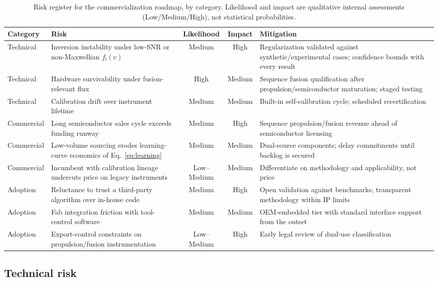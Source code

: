\begin{table}[htbp]
\centering
\caption{Risk register for the commercialization roadmap, by category. Likelihood and impact are qualitative internal assessments (Low/Medium/High), not statistical probabilities.}
\label{tab:risk}
\begin{tabularx}{\textwidth}{@{}l X c c X@{}}
\toprule
Category & Risk & Likelihood & Impact & Mitigation \\
\midrule
Technical & Inversion instability under low-SNR or non-Maxwellian $f_{\mathrm{i}}(v)$ & Medium & High & Regularization validated against synthetic/experimental cases; confidence bounds with every result \\
Technical & Hardware survivability under fusion-relevant flux & High & Medium & Sequence fusion qualification after propulsion/semiconductor maturation; staged testing \cite{ref0586,ref0588} \\
Technical & Calibration drift over instrument lifetime & Medium & Medium & Built-in self-calibration cycle; scheduled recertification \\
Commercial & Long semiconductor sales cycle exceeds funding runway & Medium & High & Sequence propulsion/fusion revenue ahead of semiconductor licensing \\
Commercial & Low-volume sourcing erodes learning-curve economics of Eq.~\eqref{eq:learning} & Medium & Medium & Dual-source components; delay commitments until backlog is secured \\
Commercial & Incumbent with calibration lineage undercuts price on legacy instruments & Low--Medium & Medium & Differentiate on methodology and applicability, not price \\
Adoption & Reluctance to trust a third-party algorithm over in-house code & Medium & High & Open validation against benchmarks; transparent methodology within IP limits \\
Adoption & Fab integration friction with tool-control software & Medium & Medium & OEM-embedded tier with standard interface support from the outset \\
Adoption & Export-control constraints on propulsion/fusion instrumentation & Low--Medium & High & Early legal review of dual-use classification \\
\bottomrule
\end{tabularx}
\end{table}

\subsection{Technical risk}

